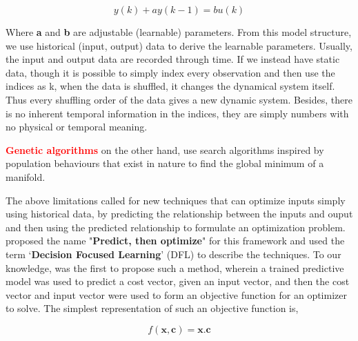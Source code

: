 \documentclass[12pt, letterpaper]{article}
\begin{document}
\begin{equation}
    y(k) + ay(k-1) = bu(k)
\end{equation}

Where \textbf{a} and \textbf{b} are adjustable (learnable) parameters. From this
model structure, we use historical (input, output) data to derive the learnable
parameters. Usually, the input and output data are recorded through time. If
we instead have static data, though it is possible to simply index every observation
and then use the indices as k, when the data is shuffled, it changes the dynamical 
system itself. Thus every shuffling order of the data gives a new dynamic system.
Besides, there is no inherent temporal information in the indices, they are simply
numbers with no physical or temporal meaning.

\textcolor{red}{\textbf{Genetic algorithms}} on the other hand, use search algorithms inspired by
population behaviours that exist in nature to find the global minimum of a
manifold. 

The above limitations called for new techniques that can optimize inputs simply
using historical data, by predicting the relationship between the inputs and
ouput and then using the predicted relationship to formulate an optimization
problem. \cite{Mandi_2024} proposed the name "\textbf{Predict, then optimize}"
for this framework and used the term `\textbf{Decision Focused Learning}' (DFL) to
describe the techniques. To our knowledge, \cite{spo} was the first to propose
such a method, wherein a trained predictive model was used to predict a cost
vector, given an input vector, and then the cost vector and input vector were
used to form an objective function for an optimizer to solve. The simplest
representation of such an objective function is,

\begin{equation}
    f(\mathbf{x}, \mathbf{c}) = \mathbf{x}.{\mathbf{c}}
\end{equation}
\end{document}

